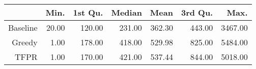 \begin{table}[ht]
\centering
\begin{tabular}{rrrrrrr}
  \hline
 & Min. & 1st Qu. & Median & Mean & 3rd Qu. & Max. \\ 
  \hline
Baseline & 20.00 & 120.00 & 231.00 & 362.30 & 443.00 & 3467.00 \\ 
  Greedy & 1.00 & 178.00 & 418.00 & 529.98 & 825.00 & 5484.00 \\ 
  TFPR & 1.00 & 170.00 & 421.00 & 537.44 & 844.00 & 5018.00 \\ 
   \hline
\end{tabular}
\end{table}
